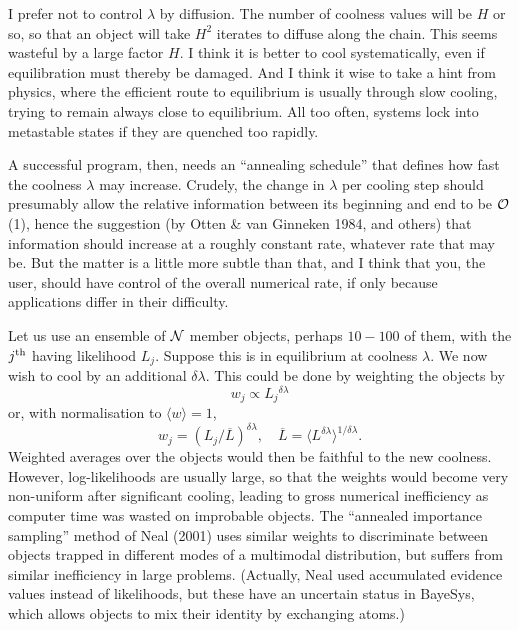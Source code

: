 I prefer not to control $\lambda$ by diffusion.  
The number of coolness values will be $H$ or so, so that an object will take $H^2$ iterates to diffuse along the chain.  
This seems wasteful by a large factor $H$.  
I think it is better to cool systematically, even if equilibration must thereby be damaged.  
And I think it wise to take a hint from physics, where the efficient route to equilibrium is usually through slow cooling, 
trying to remain always close to equilibrium.  
All too often, systems lock into metastable states if they are quenched too rapidly.

A successful program, then, needs an ``annealing schedule'' that defines how fast the coolness $\lambda$ may increase.
Crudely, the change in $\lambda$ per cooling step should presumably allow the relative information between its beginning and end to be $\cal O$(1), 
hence the suggestion (by Otten \& van Ginneken 1984, and others) that information should increase at a roughly constant rate,
whatever rate that may be.
But the matter is a little more subtle than that, and I think that you, the user, should have control of the overall numerical rate, 
if only because applications differ in their difficulty.

\vfill\eject
{}
\smallskip

Let us use an ensemble of $\cal N$ member objects, perhaps $10-100$ of them, with the $j^{\rm th}$ having likelihood $L_j$.
Suppose this is in equilibrium at coolness $\lambda$.
We now wish to cool by an additional $\delta \lambda$.
This could be done by weighting the objects by
$$
    w_j \propto L_j{}^{\delta\lambda}
$$
or, with normalisation to $\langle w \rangle = 1$,
$$
    w_j = (L_j / \overline L)^{\delta\lambda}, \quad
 \overline L = \big\langle L^{\delta\lambda} \big\rangle^{1 / \delta\lambda}.
$$
Weighted averages over the objects would then be faithful to the new coolness.  
However, log-likelihoods are usually large, so that the weights would become very non-uniform after significant cooling, 
leading to gross numerical inefficiency as computer time was wasted on improbable objects.
The ``annealed importance sampling'' method of Neal (2001) uses similar weights 
to discriminate between objects trapped in different modes of a multimodal distribution, but suffers from similar inefficiency in large problems.
(Actually, Neal used accumulated evidence values instead of likelihoods, but these have an uncertain status in BayeSys, which allows objects to mix their identity by exchanging atoms.)

